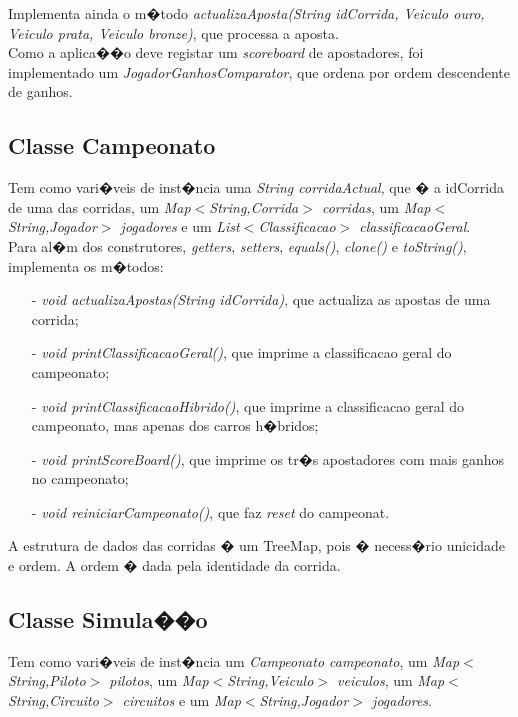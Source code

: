 \documentclass[10pt,notitlepage]{article}
\begin{document}
Implementa ainda o m�todo \textit{actualizaAposta(String idCorrida, Veiculo ouro, Veiculo prata, Veiculo bronze)}, que processa a aposta. \\

Como a aplica��o deve registar um \textit{scoreboard} de apostadores, foi implementado um \textit{JogadorGanhosComparator}, que ordena por ordem descendente de ganhos.

\newpage

\subsection{Classe Campeonato}

Tem como vari�veis de inst�ncia uma \textit{String corridaActual}, que � a idCorrida de uma das corridas, um \textit{Map$<$String,Corrida$>$ corridas}, um \textit{Map$<$String,Jogador$>$ jogadores} e um \textit{List$<$Classificacao$>$ classificacaoGeral}. \\

Para al�m dos construtores, \textit{getters}, \textit{setters}, \textit{equals()}, \textit{clone()} e \textit{toString()}, implementa os m�todos:

\begin{itemize}
\item[-] \textit{void actualizaApostas(String idCorrida)}, que actualiza as apostas de uma corrida;
\item[-] \textit{void printClassificacaoGeral()}, que imprime a classificacao geral do campeonato;
\item[-] \textit{void printClassificacaoHibrido()},  que imprime a classificacao geral do campeonato, mas apenas dos carros h�bridos;
\item[-] \textit{void printScoreBoard()}, que imprime os tr�s apostadores com mais ganhos no campeonato;
\item[-] \textit{void reiniciarCampeonato()}, que faz \textit{reset} do campeonat.
\end{itemize}

A estrutura de dados das corridas � um TreeMap, pois � necess�rio unicidade e ordem. A ordem � dada pela identidade da corrida.

\subsection{Classe Simula��o}

Tem como vari�veis de inst�ncia um \textit{Campeonato campeonato}, um \textit{Map$<$String,Piloto$>$ pilotos}, um \textit{Map$<$String,Veiculo$>$ veiculos}, um \textit{Map$<$String,Circuito$>$ circuitos} e um \textit{Map$<$String,Jogador$>$ jogadores}. \\
\end{document}
